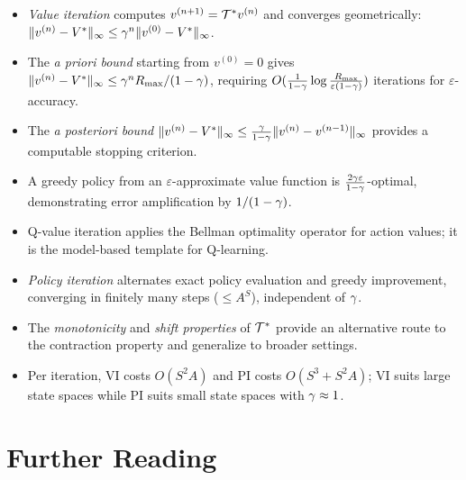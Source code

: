 \documentclass[11pt,a4paper]{article}
\begin{document}
\begin{itemize}
    \item \emph{Value iteration} computes $v^{(n+1)} = \mathcal{T}^*
    v^{(n)}$ and converges geometrically:
    $\|v^{(n)} - V^*\|_\infty \leq \gamma^n
    \|v^{(0)} - V^*\|_\infty$.
    \item The \emph{a priori bound} starting from $v^{(0)} = 0$
    gives $\|v^{(n)} - V^*\|_\infty \leq
    \gamma^n R_{\max}/(1-\gamma)$, requiring
    $O(\frac{1}{1-\gamma}
    \log\frac{R_{\max}}{\varepsilon(1-\gamma)})$ iterations for
    $\varepsilon$-accuracy.
    \item The \emph{a posteriori bound}
    $\|v^{(n)} - V^*\|_\infty \leq
    \frac{\gamma}{1-\gamma}\|v^{(n)} - v^{(n-1)}\|_\infty$
    provides a computable stopping criterion.
    \item A greedy policy from an $\varepsilon$-approximate value
    function is $\frac{2\gamma\varepsilon}{1-\gamma}$-optimal,
    demonstrating error amplification by $1/(1-\gamma)$.
    \item Q-value iteration applies the Bellman optimality operator
    for action values; it is the model-based template for Q-learning.
    \item \emph{Policy iteration} alternates exact policy evaluation
    and greedy improvement, converging in finitely many steps
    ($\leq A^S$), independent of $\gamma$.
    \item The \emph{monotonicity} and \emph{shift properties} of
    $\mathcal{T}^*$ provide an alternative route to the contraction
    property and generalize to broader settings.
    \item Per iteration, VI costs $O(S^2 A)$ and PI costs
    $O(S^3 + S^2 A)$; VI suits large state spaces while PI suits
    small state spaces with $\gamma \approx 1$.
\end{itemize}


\section{Further Reading}
\label{sec:further-reading}
\end{document}

